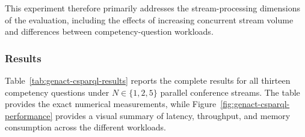 This experiment therefore primarily addresses the stream-processing
dimensions of the evaluation, including the effects of increasing concurrent
stream volume and differences between competency-question workloads.


\subsubsection{Results}
\label{subsubsec:genact-csparql-results}

Table~\ref{tab:genact-csparql-results} reports the complete results for all
thirteen competency questions under $N\in\{1,2,5\}$ parallel conference
streams. The table provides the exact numerical measurements, while
Figure~\ref{fig:genact-csparql-performance} provides a visual summary of
latency, throughput, and memory consumption across the different workloads.

